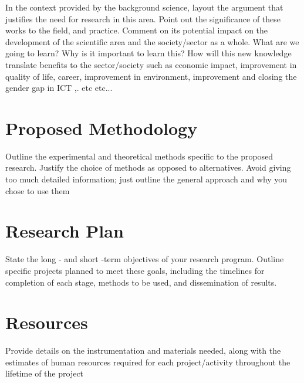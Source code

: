 \documentclass{article}
\begin{document}
In the context provided by the background science, layout the argument that justifies the need for research in this area. Point out the significance of these works to the field, and practice. Comment on its potential impact on the development of the scientific area and the society/sector as a whole. What are we going to learn? Why is it important to learn this? How will this new knowledge translate benefits to the sector/society such as economic impact, improvement in quality of life, career, improvement in environment, improvement and closing the gender gap in ICT ,. etc etc...

\section{Proposed Methodology}
Outline the experimental and theoretical methods specific to the proposed research. Justify the choice of methods as opposed to alternatives. Avoid giving too much detailed information; just outline the general approach and why you chose to use them

\section{Research Plan}
State the long - and short -term objectives of your research program. Outline specific projects planned to meet these goals, including the timelines for completion of each stage, methods to be used, and dissemination of results. 

\section{Resources}
Provide details on the instrumentation and materials needed, along with the estimates of human resources required for each project/activity throughout the lifetime of the project



\end{document}
